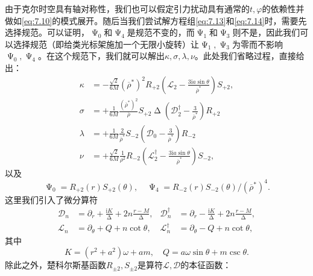 由于克尔时空具有轴对称性，我们也可以假定引力扰动具有通常的$t,\varphi $的依赖性并做如\ref{eq:7.10}的模式展开。随后当我们尝试解方程组\ref{eq:7.13}和\ref{eq:7.14}时，需要先选择规范。可以证明，$\upPsi _{0}$和$\upPsi _{4}$是规范不变的，而$\upPsi _{1}$和$\upPsi _{3}$则不是，因此我们可以选择规范（即给类光标架施加一个无限小旋转）让$\upPsi _{1} ,\upPsi _{3}$为零而不影响$\upPsi _{0} ,\upPsi _{4}$。在这个规范下，我们就可以解出$\kappa ,\sigma ,\lambda ,\nu $。此处我们省略过程，直接给出\parencite{chandrasekhar1998mathematical}：
\begin{equation*}
	\begin{aligned}
		\kappa  & =-\frac{\sqrt{2}}{6M} (\overline{\rho }^{*} )^{2} R_{+2}\left(\mathcal{L}_{2} -\frac{3\mathrm{i} a\sin \theta }{\overline{\rho }^{*}}\right) S_{+2} ,\\
		\sigma  & =+\frac{1}{6M}\frac{(\overline{\rho }^{*} )^{2}}{\overline{\rho }} S_{+2} \upDelta \left(\mathcal{D}_{2}^{\dagger } -\frac{3}{\overline{\rho }^{*}}\right) R_{+2}\\
		\lambda  & =+\frac{1}{6M}\frac{2}{\overline{\rho }^{*}} S_{-2}\left(\mathcal{D}_{0} -\frac{3}{\overline{\rho }^{*}}\right) R_{-2}\\
		\nu  & =+\frac{\sqrt{2}}{6M}\frac{1}{\rho ^{2}} R_{-2}\left(\mathcal{L}_{2}^{\dagger } -\frac{3\mathrm{i} a\sin \theta }{\overline{\rho }^{*}}\right) S_{-2} ,
	\end{aligned}
\end{equation*}
以及
\begin{equation*}
	\upPsi _{0} =R_{+2}( r) S_{+2}( \theta ) ,\quad \upPsi _{4} =R_{-2}( r) S_{-2}( \theta ) /(\overline{\rho }^{*} )^{4} .
\end{equation*}
这里我们引入了微分算符
\begin{equation*}
	\begin{aligned}
		\mathcal{D}_{n} & =\partial _{r} +\frac{\mathrm{i} K}{\upDelta } +2n\frac{r-M}{\upDelta } , & \mathcal{D}_{n}^{\dagger } & =\partial _{r} -\frac{\mathrm{i} K}{\upDelta } +2n\frac{r-M}{\upDelta } ,\\
		\mathcal{L}_{n} & =\partial _{\theta } +Q+n\cot \theta , & \mathcal{L}_{n}^{\dagger } & =\partial _{\theta } -Q+n\cot \theta ,
	\end{aligned}
\end{equation*}
其中
\begin{equation*}
	K=(r^{2} +a^{2} )\omega +am,\quad Q=a\omega \sin \theta +m\csc \theta .
\end{equation*}
除此之外，$ $楚科尔斯基函数$R_{\pm 2} ,S_{\pm 2}$是算符$\mathcal{L} ,\mathcal{D}$的本征函数：
